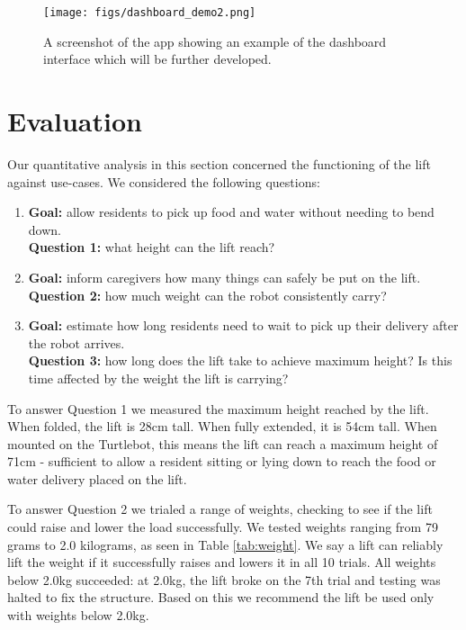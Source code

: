 \documentclass{article}
\begin{document}
\begin{figure}
  \begin{center}
    \texttt{[image: figs/dashboard\_demo2.png]}
    \caption{A screenshot of the app showing an example of the dashboard interface which will be further developed.}
  \label{fig:dashboard}
  \end{center}
\end{figure}


\section{Evaluation}
Our quantitative analysis in this section concerned the functioning of the lift against use-cases. We considered the following questions:
\begin{enumerate}
\item {\bf Goal:} allow residents to pick up food and water without needing to bend down. \\{\bf Question 1:} what height can the lift reach?
\item {\bf Goal:} inform caregivers how many things can safely be put on the lift. \\{\bf Question 2:} how much weight can the robot consistently carry?
\item {\bf Goal:} estimate how long residents need to wait to pick up their delivery after the robot arrives. \\{\bf Question 3:} how long does the lift take to achieve maximum height? Is this time affected by the weight the lift is carrying?
\end{enumerate}

To answer Question 1 we measured the maximum height reached by the lift. When folded, the lift is 28cm tall. When fully extended, it is 54cm tall. When mounted on the Turtlebot, this means the lift can reach a maximum height of 71cm - sufficient to allow a resident sitting or lying down to reach the food or water delivery placed on the lift.

To answer Question 2 we trialed a range of weights, checking to see if the lift could raise and lower the load successfully. We tested weights ranging from 79 grams to 2.0 kilograms, as seen in Table \ref{tab:weight}. We say a lift can reliably lift the weight if it successfully raises and lowers it in all 10 trials. All weights below 2.0kg succeeded: at 2.0kg, the lift broke on the 7th trial and testing was halted to fix the structure. Based on this we recommend the lift be used only with weights below 2.0kg.
\end{document}
